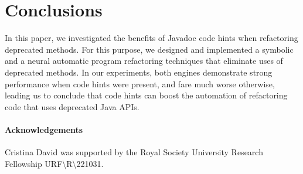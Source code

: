 \documentclass[sigconf]{acmart}
\begin{document}





\section{Conclusions}

In this paper, we investigated the benefits of Javadoc code hints when
refactoring deprecated methods.  For this purpose, we designed and
implemented a symbolic and a neural automatic program refactoring techniques
that eliminate uses of deprecated methods.  In our experiments, both engines
demonstrate strong performance when code hints were present, and fare much
worse otherwise, leading us to conclude that code hints can boost the
automation of refactoring code that uses deprecated Java APIs.


\paragraph{Acknowledgements}
Cristina David was supported by the Royal Society University Research Fellowship URF{\textbackslash}R{\textbackslash}221031.
\end{document}
